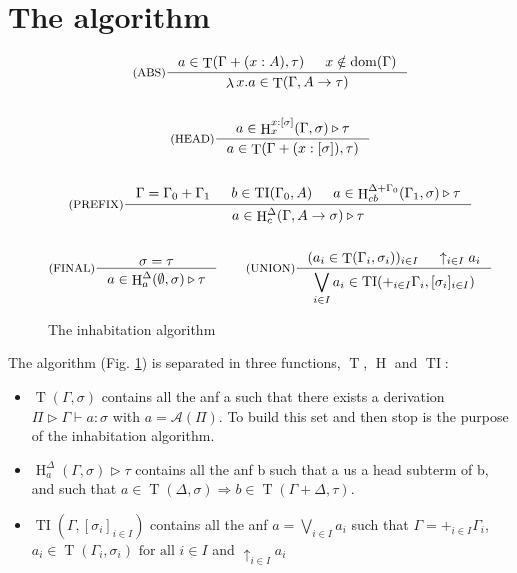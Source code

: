 \documentclass{article}
\DeclareMathOperator{\iT}{T}
\DeclareMathOperator{\iH}{H}
\DeclareMathOperator{\iTI}{TI}
\DeclareMathOperator{\iDom}{dom}
\DeclareMathOperator{\iLambda}{\lambda}
\begin{document}
\section{The algorithm}
\begin{figure}[h]
    \begin{mdframed}
        \begin{gather*}
            \inference[(ABS)]{a \in \iT(\Gamma + (x : A), \tau) & x \notin \iDom(\Gamma)}{\iLambda x.a \in \iT(\Gamma, A \rightarrow \tau)}
            \\ \\
            \inference[(HEAD)]{a \in \iH^{x:[\sigma]}_x(\Gamma, \sigma) \triangleright \tau}{a \in\iT(\Gamma + (x:[\sigma]), \tau) }
            \\ \\
            \inference[(PREFIX)]{\Gamma = \Gamma_0 + \Gamma_1 & b \in \iTI(\Gamma_0, A) & a \in \iH^{\Delta + \Gamma_0}_{cb}(\Gamma_1, \sigma) \triangleright \tau}{a \in \iH^{\Delta}_c(\Gamma, A \rightarrow \sigma) \triangleright \tau}
            \\ \\
            \inference[(FINAL)]{\sigma = \tau}{a \in \iH^{\Delta}_a(\emptyset, \sigma) \triangleright \tau}
            \qquad
            \inference[(UNION)]{(a_i \in \iT(\Gamma_i, \sigma_i))_{i \in I} & \uparrow_{i \in I}a_i}{\displaystyle \bigvee_{i \in I} a_i \in \iTI(+_{i \in I}\Gamma_i, [\sigma_i]_{i \in I}) }
        \end{gather*}
    \end{mdframed}
  \caption{The inhabitation algorithm}
  \label{INH}
\end{figure}
The algorithm (Fig. \ref{INH}) is separated in three functions, $\iT$, $\iH$ and $\iTI$:
\begin{itemize}
\item $\iT(\Gamma, \sigma)$ contains all the anf a such that there exists a derivation $\Pi \triangleright \Gamma \vdash a : \sigma$ with $a = \mathcal{A}(\Pi)$. To build this set and then stop is the purpose of the inhabitation algorithm.
\item $\iH^\Delta_a(\Gamma, \sigma) \triangleright \tau$ contains all the anf b such that a us a head subterm of b, and such that $a \in \iT(\Delta, \sigma) \Rightarrow b \in \iT(\Gamma + \Delta, \tau)$.
\item $\iTI(\Gamma, [\sigma_i]_{i \in I})$ contains all the anf $a = \bigvee_{i\in I}a_i$ such that $ \Gamma = +_{i \in I} \Gamma_i $, $ a_i \in \iT(\Gamma_i, \sigma_i)\text{ for all }i \in I $ and $\uparrow_{i \in I}a_i$
\end{itemize}
\end{document}
